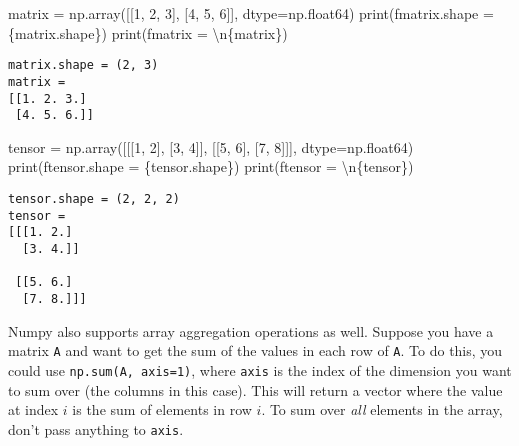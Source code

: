 \documentclass[
  letterpaper,
  DIV=11,
  numbers=noendperiod]{scrreprt}
\newenvironment{Shaded}{\begin{snugshade}}{\end{snugshade}}
\newcommand{\BuiltInTok}[1]{\textcolor[rgb]{0.00,0.23,0.31}{#1}}
\newcommand{\CharTok}[1]{\textcolor[rgb]{0.13,0.47,0.30}{#1}}
\newcommand{\DecValTok}[1]{\textcolor[rgb]{0.68,0.00,0.00}{#1}}
\newcommand{\NormalTok}[1]{\textcolor[rgb]{0.00,0.23,0.31}{#1}}
\newcommand{\OperatorTok}[1]{\textcolor[rgb]{0.37,0.37,0.37}{#1}}
\newcommand{\SpecialCharTok}[1]{\textcolor[rgb]{0.37,0.37,0.37}{#1}}
\newcommand{\SpecialStringTok}[1]{\textcolor[rgb]{0.13,0.47,0.30}{#1}}
\begin{document}
\begin{Shaded}
\begin{Highlighting}[]
\NormalTok{matrix }\OperatorTok{=}\NormalTok{ np.array([[}\DecValTok{1}\NormalTok{, }\DecValTok{2}\NormalTok{, }\DecValTok{3}\NormalTok{], [}\DecValTok{4}\NormalTok{, }\DecValTok{5}\NormalTok{, }\DecValTok{6}\NormalTok{]], dtype}\OperatorTok{=}\NormalTok{np.float64)}
\BuiltInTok{print}\NormalTok{(}\SpecialStringTok{f\textquotesingle{}matrix.shape = }\SpecialCharTok{\{}\NormalTok{matrix}\SpecialCharTok{.}\NormalTok{shape}\SpecialCharTok{\}}\SpecialStringTok{\textquotesingle{}}\NormalTok{)}
\BuiltInTok{print}\NormalTok{(}\SpecialStringTok{f\textquotesingle{}matrix = }\CharTok{\textbackslash{}n}\SpecialCharTok{\{}\NormalTok{matrix}\SpecialCharTok{\}}\SpecialStringTok{\textquotesingle{}}\NormalTok{)}
\end{Highlighting}
\end{Shaded}

\begin{verbatim}
matrix.shape = (2, 3)
matrix = 
[[1. 2. 3.]
 [4. 5. 6.]]
\end{verbatim}

\begin{Shaded}
\begin{Highlighting}[]
\NormalTok{tensor }\OperatorTok{=}\NormalTok{ np.array([[[}\DecValTok{1}\NormalTok{, }\DecValTok{2}\NormalTok{], [}\DecValTok{3}\NormalTok{, }\DecValTok{4}\NormalTok{]], [[}\DecValTok{5}\NormalTok{, }\DecValTok{6}\NormalTok{], [}\DecValTok{7}\NormalTok{, }\DecValTok{8}\NormalTok{]]], dtype}\OperatorTok{=}\NormalTok{np.float64)}
\BuiltInTok{print}\NormalTok{(}\SpecialStringTok{f\textquotesingle{}tensor.shape = }\SpecialCharTok{\{}\NormalTok{tensor}\SpecialCharTok{.}\NormalTok{shape}\SpecialCharTok{\}}\SpecialStringTok{\textquotesingle{}}\NormalTok{)}
\BuiltInTok{print}\NormalTok{(}\SpecialStringTok{f\textquotesingle{}tensor = }\CharTok{\textbackslash{}n}\SpecialCharTok{\{}\NormalTok{tensor}\SpecialCharTok{\}}\SpecialStringTok{\textquotesingle{}}\NormalTok{)}
\end{Highlighting}
\end{Shaded}

\begin{verbatim}
tensor.shape = (2, 2, 2)
tensor = 
[[[1. 2.]
  [3. 4.]]

 [[5. 6.]
  [7. 8.]]]
\end{verbatim}

Numpy also supports array aggregation operations as well. Suppose you
have a matrix \texttt{A} and want to get the sum of the values in each
row of \texttt{A}. To do this, you could use
\texttt{np.sum(A,\ axis=1)}, where \texttt{axis} is the index of the
dimension you want to sum over (the columns in this case). This will
return a vector where the value at index \(i\) is the sum of elements in
row \(i\). To sum over \emph{all} elements in the array, don't pass
anything to \texttt{axis}.
\end{document}
